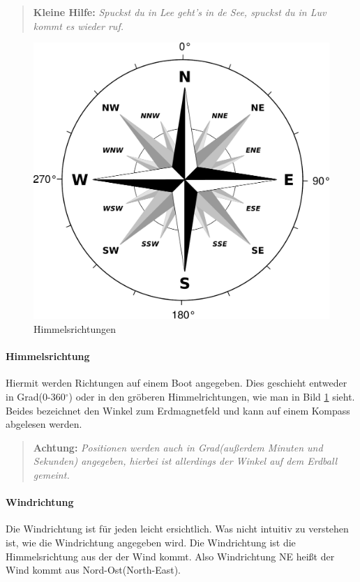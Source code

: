\documentclass[12pt]{article}
\begin{document}
\begin{quote}
\textbf{Kleine Hilfe:} \textit{Spuckst du in Lee geht's in de See, spuckst du in Luv kommt es wieder ruf.}
\end{quote}

\begin{figure}[H]
\begin{center}
\includegraphics[scale=0.4]{bilder/windrose.pdf}
\caption{Himmelsrichtungen}
\label{himmelsrichtungen}
\end{center}
\end{figure}

\paragraph{Himmelsrichtung}
Hiermit werden Richtungen auf einem Boot angegeben. Dies geschieht entweder in Grad(0-360$^\circ$) oder in den gröberen Himmelrichtungen, wie man in Bild \ref{himmelsrichtungen} sieht. Beides bezeichnet den Winkel zum Erdmagnetfeld und kann auf einem Kompass abgelesen werden.

\begin{quote}
\textbf{Achtung:} \textit{Positionen werden auch in Grad(außerdem Minuten und Sekunden) angegeben, hierbei ist allerdings der Winkel auf dem Erdball gemeint.}
\end{quote}

\paragraph{Windrichtung}
Die Windrichtung ist für jeden leicht ersichtlich. Was nicht intuitiv zu verstehen ist, wie die Windrichtung angegeben wird. Die Windrichtung ist die Himmelsrichtung aus der der Wind kommt. Also Windrichtung NE heißt der Wind kommt aus Nord-Ost(North-East).
\end{document}
